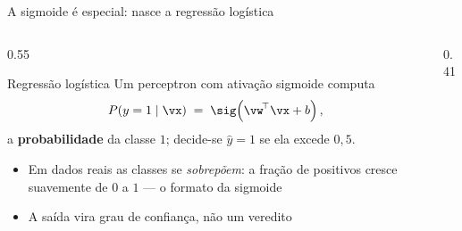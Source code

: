 \documentclass[aspectratio=169, 11pt]{beamer}
\begin{document}
\begin{frame}{A sigmoide é especial: nasce a regressão logística}
  \begin{columns}[T]
    \begin{column}{0.55\textwidth}
      \begin{defbox}{Regressão logística}
        Um perceptron com ativação sigmoide computa
        \[
          P(y = 1 \mid \vx) \;=\; \sig\!\left(\vw^{\!\top}\vx + b\right),
        \]
        a \textbf{probabilidade} da classe $1$; decide-se $\hat{y}=1$
        se ela excede $0{,}5$.
      \end{defbox}
      \begin{itemize}\setlength{\itemsep}{0.3ex}
        \item Em dados reais as classes se \emph{sobrepõem}: a fração de
              positivos cresce suavemente de $0$ a $1$ — o formato da sigmoide
        \item A saída vira \alert{grau de confiança}, não um veredito
      \end{itemize}
    \end{column}
    \begin{column}{0.41\textwidth}
      \begin{center}
      \end{center}
    \end{column}
  \end{columns}

\end{frame}
\end{document}
